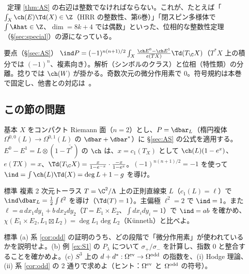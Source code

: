 \begin{rem}[整数性]\label{rem:integrality}\tC\
定理 \ref{thm:AS} の右辺は整数でなければならない。これが、たとえば「$\int_X\ch(E)\Td(X)\in\Z$（HRR の整数性、第6巻）」「閉スピン多様体で $\int\Ahat\in\Z$、$\dim=8k+4$ では偶数」といった、位相的な整数性定理（\S\ref{sec:special}）の源になっている。
\end{rem}
\begin{keybox}{要点（\S\ref{sec:AS}）}
$\ind P=(-1)^{n(n+1)/2}\int_X\frac{\ch E^0-\ch E^1}{e(TX)}\Td(T_{\C}X)$（$T^*X$ 上の積分では $(-1)^n$、複素向き）。解析（シンボルのクラス）と位相（特性類）の分離。捻りでは $\ch(W)$ が掛かる。奇数次元の微分作用素で $0$。符号規約は本巻で固定し、他書との対応は\tQ\ 。
\end{keybox}
\subsection*{この節の問題}
\begin{prob}{基本}\label{p:RSform}
$X$ をコンパクト Riemann 面（$n=2$）とし、$P=\dbar_L$（楕円複体 $\Omega^{0,0}(L)\to\Omega^{0,1}(L)$ の $\dbar+\dbar^*$）に \S\ref{sec:AS} の公式を適用する。$E^0-E^1=L\otimes(1-\overline{T^*})$ の $\ch$ は、$x=c_1(T_X)$ として $\ch(L)(1-e^{x})$、$e(TX)=x$、$\Td(T_{\C}X)=\frac{x}{1-e^{-x}}\cdot\frac{-x}{1-e^{x}}$。$(-1)^{n(n+1)/2}=-1$ を使って $\ind=\int\ch(L)\Td(X)=\deg L+1-g$ を導け。
\end{prob}
\begin{prob}{標準}\label{p:torus4}
複素 2 次元トーラス $T=\C^2/\Lambda$ 上の正則直線束 $L$（$c_1(L)=\ell$）で $\ind\dbar_L=\frac12\int\ell^2$ を導け（$\Td(T)=1$）。主偏極 $\ell^2=2$ で $\ind=1$。また $\ell=a\,dx_1dy_1+b\,dx_2dy_2$（$T=E_1\times E_2$、$\int dx_idy_i=1$）で $\ind=ab$ を確かめ、$\chi(E_1\times E_2,L_1\boxtimes L_2)=\deg L_1\deg L_2$（Künneth）と比べよ。
\end{prob}
\begin{prob}{標準}\label{p:odd}
(a) 系 \ref{cor:odd} の証明のうち、どの段階で「微分作用素」が使われているかを説明せよ。(b) 例 \ref{ex:S1} の $P_\lambda$ について $\sigma_+/\sigma_-$ を計算し、指数 $0$ と整合することを確かめよ。(c) $S^3$ 上の $d+d^*:\Omega^{\rm ev}\to\Omega^{\rm odd}$ の指数を、(i) Hodge 理論、(ii) 系 \ref{cor:odd} の 2 通りで求めよ（ヒント：$\Omega^{\rm ev}$ と $\Omega^{\rm odd}$ の符号）。
\end{prob}
